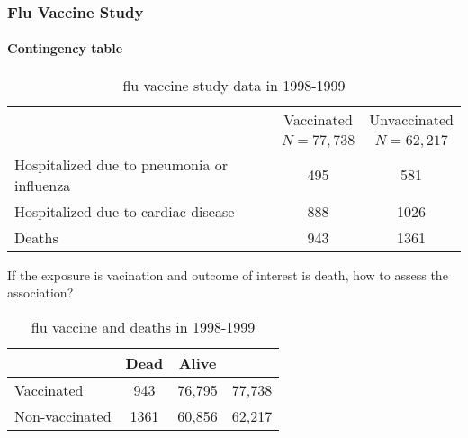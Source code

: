 \documentclass[table,10pt]{beamer}
\begin{document}
\begin{CJK*}{UTF8}{gbsn}
\begin{frame}[t]
\frametitle{Flu Vaccine Study}
\framesubtitle{Contingency table}
\begin{table}
\renewcommand\arraystretch{1.2}
\scriptsize
\caption{flu vaccine study data in 1998-1999}
\begin{tabular}{p{3cm}cc}
\hline
& Vaccinated & Unvaccinated\\
& $N=77,738$ & $N=62,217$ \\
\hline
Hospitalized due to pneumonia or influenza & 495 & 581\\
\hline
Hospitalized due to cardiac disease & 888 & 1026\\
\hline
Deaths & 943 & 1361\\
\hline
\end{tabular}
\end{table}
\alert{If the exposure is vacination and outcome of interest is death, how to assess the 
association?}
\begin{table}
\renewcommand\arraystretch{1.2}
\small
\caption{flu vaccine and deaths in 1998-1999}
\begin{tabular}{lccc}
\hline
 & Dead & Alive & \\
\hline
Vaccinated & 943 & 76,795 & 77,738\\
Non-vaccinated & 1361 & 60,856 & 62,217\\
\hline
\end{tabular}
\end{table}
\end{frame}


\end{CJK*}
\end{document}
